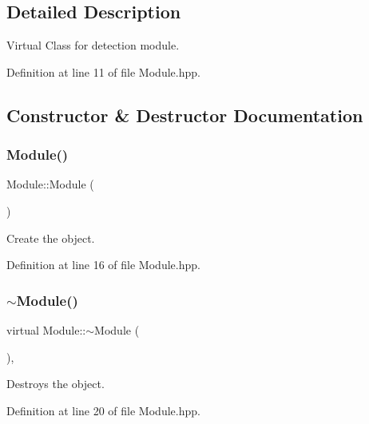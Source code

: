 \subsection{Detailed Description}
Virtual Class for detection module. 

Definition at line 11 of file Module.\+hpp.



\subsection{Constructor \& Destructor Documentation}
\mbox{\label{class_module_a5a240a8a9ab1813b17bcb810b24ceaea}} 
\subsubsection{\texorpdfstring{Module()}{Module()}}
{\footnotesize\ttfamily Module\+::\+Module (\begin{DoxyParamCaption}{ }\end{DoxyParamCaption})\hspace{0.3cm}{\ttfamily [inline]}}



Create the object. 



Definition at line 16 of file Module.\+hpp.

\mbox{\label{class_module_a57f2a54e7dacfb7a67355f1412c07130}} 
\subsubsection{\texorpdfstring{$\sim$\+Module()}{~Module()}}
{\footnotesize\ttfamily virtual Module\+::$\sim$\+Module (\begin{DoxyParamCaption}{ }\end{DoxyParamCaption})\hspace{0.3cm}{\ttfamily [inline]}, {\ttfamily [virtual]}}



Destroys the object. 



Definition at line 20 of file Module.\+hpp.



